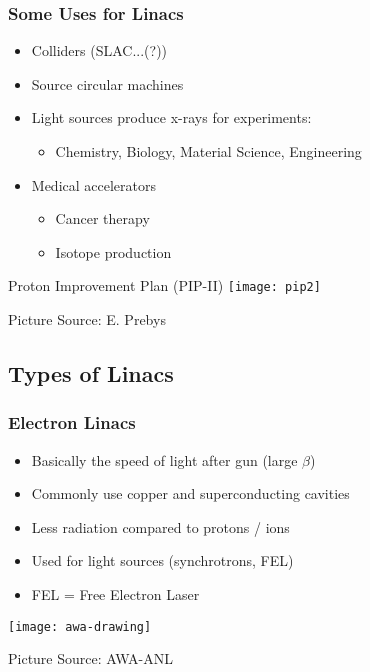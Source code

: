 \documentclass[professionalfonts,t]{beamer}
\begin{document}
\begin{frame}
\frametitle{Some Uses for Linacs}
\vspace{-0.5em}
\begin{minipage}{0.45\textwidth}
	\begin{itemize}
		\item Colliders (SLAC...(?))
		\item Source circular machines
		\item Light sources produce x-rays for experiments:
		\begin{itemize}
			\item Chemistry, Biology, Material Science, Engineering
		\end{itemize}
		\item Medical accelerators 
		\begin{itemize}
			\item Cancer therapy 
			\item Isotope production
		\end{itemize}
	\end{itemize}
\end{minipage}\hfill
\begin{minipage}{0.5\textwidth}
	\centering
	\vspace{-1.25em}
	
	\small Proton Improvement Plan (PIP-II)
	\texttt{[image: pip2]}
	
	\vspace{-0.25em}
	Picture Source: E. Prebys
\end{minipage}
\end{frame}


\subsection{Types of Linacs}
\begin{frame}[containsverbatim]
\frametitle{Electron Linacs}
\begin{itemize}
	\item Basically the speed of light after gun (large $\beta$)
	\item Commonly use copper and superconducting cavities
	\item Less radiation compared to protons / ions
	\item Used for light sources (synchrotrons, FEL)
	\item FEL = Free Electron Laser
\end{itemize}

\texttt{[image: awa-drawing]}

\hfill Picture Source: AWA-ANL
\end{frame}
\end{document}
